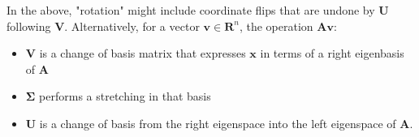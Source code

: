 In the above, "rotation" might include coordinate flips that are undone by $\mathbf{U}$ following $\mathbf{V}$. Alternatively, for a vector $\mathbf{v}\in\mathbf{R}^{n}$, the operation $\mathbf{Av}$:

\begin{itemize}
\item $\mathbf{V}$ is a change of basis matrix that expresses $\mathbf{x}$ in terms of a right eigenbasis of $\mathbf{A}$
\item $\mathbf{\Sigma}$ performs a stretching in that basis
\item $\mathbf{U}$ is a change of basis from the right eigenspace into the left eigenspace of $\mathbf{A}$. 
\end{itemize}

